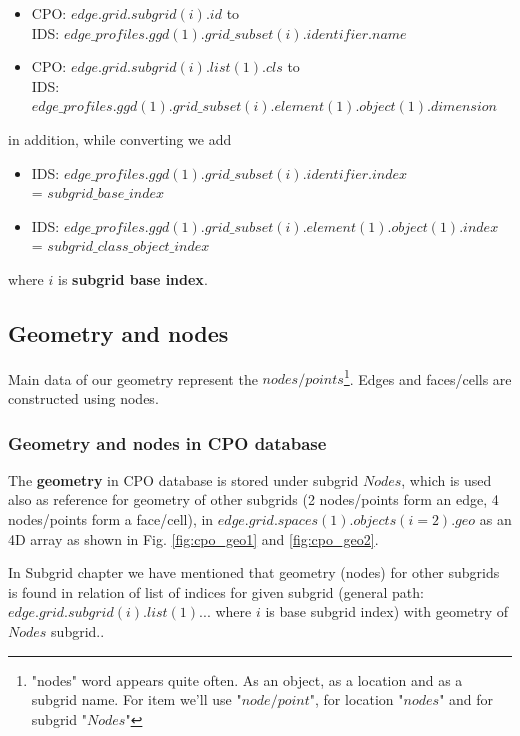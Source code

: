 \documentclass[a4paper,12pt,twoside]{article}
\begin{document}
\begin{itemize}
\item CPO: $edge.grid.subgrid(i).id$ to \\
IDS: $edge\_profiles.ggd(1).grid\_subset(i).identifier.name$
\item CPO: $edge.grid.subgrid(i).list(1).cls$ to \\
IDS: $edge\_profiles.ggd(1).grid\_subset(i).element(1).object(1).dimension$
\end{itemize}

in addition, while converting we add
\begin{itemize}
\item IDS: $edge\_profiles.ggd(1).grid\_subset(i).identifier.index$ \\ = $subgrid\_base\_index$
\item IDS: $edge\_profiles.ggd(1).grid\_subset(i).element(1).object(1).index$ \\
= $subgrid\_class\_object\_index$
\end{itemize}

where $i$ is \textbf{subgrid base index}.

\clearpage

\subsection{Geometry and nodes}
Main data of our geometry represent the $nodes/points$\footnote[1]{"nodes" word appears quite often. As an object, as a location and as a subgrid name. For item we'll use "$node/point$", for location "$nodes$" and for subgrid "$Nodes$"}. Edges and faces/cells are constructed using nodes. 

\subsubsection{Geometry and nodes in CPO database}

The \textbf{geometry} in CPO database is stored under subgrid $Nodes$, which is used also as reference for geometry of other subgrids (2 nodes/points form an edge, 4 nodes/points form a face/cell), in $edge.grid.spaces(1).objects(i=2).geo$ as an 4D array as shown in Fig. \ref{fig:cpo_geo1} and \ref{fig:cpo_geo2}. 

In Subgrid chapter we have mentioned that geometry (nodes) for other subgrids is found in relation of list of indices for given subgrid (general path: \\ $edge.grid.subgrid(i).list(1)...$ where $i$ is base subgrid index) with geometry of $Nodes$ subgrid..
\end{document}
